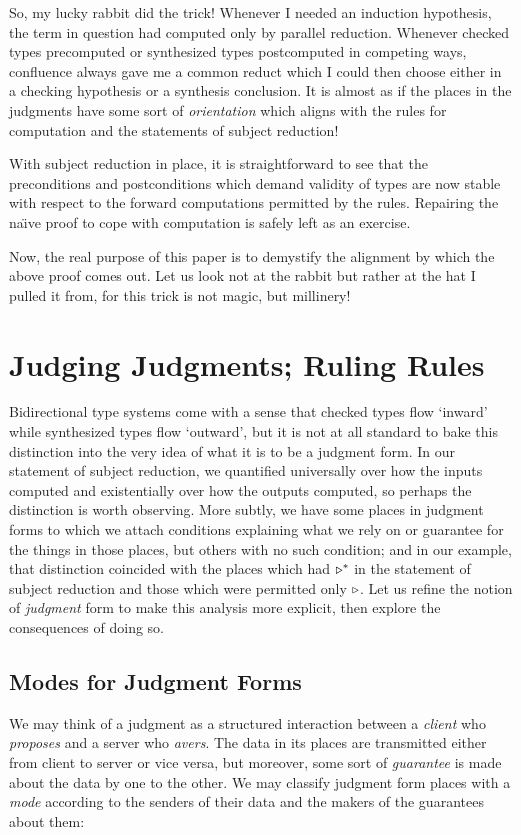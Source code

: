 \documentclass[format=acmsmall, screen, review, anonymous, timestamp]{acmart}
\begin{document}
So, my lucky rabbit did the trick! Whenever I needed an induction hypothesis, the term in question had computed only by parallel reduction. Whenever checked types precomputed or synthesized types postcomputed in competing ways, confluence always gave me a common reduct which I could then choose either in a checking hypothesis or a synthesis conclusion. It is almost as if the places in the judgments have some sort of \emph{orientation} which aligns with the rules for computation and the statements of subject reduction!

With subject reduction in place, it is straightforward to see that the preconditions and postconditions which demand validity of types are now stable with respect to the forward computations permitted by the rules. Repairing the na\"\i{}ve proof to cope with computation is safely left as an exercise.

Now, the real purpose of this paper is to demystify the alignment by which the above proof comes out. Let us look not at the rabbit but rather at the hat I pulled it from, for this trick is not magic, but millinery!


\section{Judging Judgments; Ruling Rules}

Bidirectional type systems come with a sense that checked types flow `inward' while synthesized types flow `outward', but it is not at all standard to bake this distinction into the very idea of what it is to be a judgment form. In our statement of subject reduction, we quantified universally over how the inputs computed and existentially over how the outputs computed, so perhaps the distinction is worth observing. More subtly, we have some places in judgment forms to which we attach conditions explaining what we rely on or guarantee for the things in those places, but others with no such condition; and in our example, that distinction coincided with the places which had $\triangleright^\ast$ in the statement of subject reduction and those which were permitted only $\triangleright$. Let us refine the notion of \emph{judgment} form to make this analysis more explicit, then explore the consequences of doing so.


\subsection{Modes for Judgment Forms}

We may think of a judgment as a structured interaction between a \emph{client} who \emph{proposes} and a server who \emph{avers}. The data in its places are transmitted either from client to server or vice versa, but moreover, some sort of \emph{guarantee} is made about the data by one to the other. We may classify judgment form places with a \emph{mode} according to the senders of their data and the makers of the guarantees about them:
\end{document}

